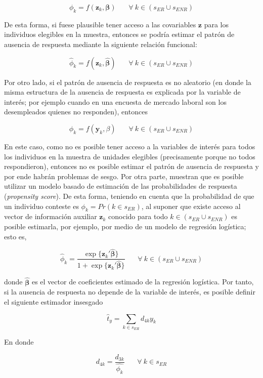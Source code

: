 \documentclass[
  12pt,
]{book}
\begin{document}
\[
\phi_k = f(\mathbf{z}_k, \boldsymbol{\beta})   \ \ \ \ \ \ \ \ \forall \ k \in (s_{ER} \cup s_{ENR})
\]

De esta forma, si fuese plausible tener acceso a las covariables \(\mathbf{z}\) para los individuos elegibles en la muestra, entonces se podría estimar el patrón de ausencia de respuesta mediante la siguiente relación funcional:

\[
\hat{\phi}_k = f(\mathbf{z}_k, \hat{\boldsymbol{\beta}})   \ \ \ \ \ \ \ \ \forall \ k \in (s_{ER} \cup s_{ENR})
\]

Por otro lado, si el patrón de ausencia de respuesta es no aleatorio (en donde la misma estructura de la ausencia de respuesta es explicada por la variable de interés; por ejemplo cuando en una encuesta de mercado laboral son los desempleados quienes no responden), entonces

\[
\phi_k = f(\mathbf{y}_k, \beta)   \ \ \ \ \ \ \ \ \forall \ k \in (s_{ER} \cup s_{ENR})
\]

En este caso, como no es posible tener acceso a la variables de interés para todos los individuos en la muestra de unidades elegibles (precisamente porque no todos respondieron), entonces no es posible estimar el patrón de ausencia de respuesta y por ende habrán problemas de sesgo. Por otra parte, \citet{Kim_Riddles_2012} muestran que es posible utilizar un modelo basado de estimación de las probabilidades de respuesta (\emph{propensity score}). De esta forma, teniendo en cuenta que la probabilidad de que un individuo conteste es \(\phi_k = Pr(k \in s_{ER})\), al suponer que existe acceso al vector de información auxiliar \(\mathbf{z}_k\) conocido para todo \(k\in (s_{ER} \cup s_{ENR})\) es posible estimarla, por ejemplo, por medio de un modelo de regresión logística; esto es,

\[
\hat{\phi}_k = \frac{\exp\{\mathbf{z}_k'\hat{\boldsymbol{\beta}}\}}{1 + \exp\{\mathbf{z}_k'\hat{\boldsymbol{\beta}}\}}   \ \ \ \ \ \ \ \ \forall \ k \in (s_{ER} \cup s_{ENR})
\]

donde \(\hat{\mathbf{\beta}}\) es el vector de coeficientes estimado de la regresión logística. Por tanto, si la ausencia de respuesta no depende de la variable de interés, es posible definir el siguiente estimador insesgado

\[
\hat{t}_y=\sum_{k\in s_{ER}}d_{4k}y_k
\]

En donde

\[
d_{4k} = \frac{d_{3k}}{\hat{\phi_k}}  \ \ \ \ \ \ \ \ \forall \ k  \in s_{ER}
\]
\end{document}
